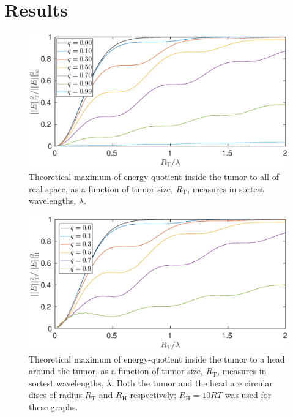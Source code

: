 \documentclass[11pt,a4paper, 
swedish,english %
]{article}
\newcommand{\RT}{\ensuremath{R_{\text{T}}}}
\newcommand{\RH}{\ensuremath{R_{\text{H}}}}
\begin{document}
\section{Results}

\begin{figure}\centering
\centerline{ %
\includegraphics[width=18cm]{ring_T-infty_L1000.eps}
}
\caption{Theoretical maximum of energy-quotient inside the tumor
  to all of real space, as a function of tumor size, $\RT$, measures
  in sortest wavelengths, $\lambda$.}
\label{fig:T-infty}
\end{figure}

\begin{figure}\centering
\centerline{ %
\includegraphics[width=18cm]{ring_T-H_L1000.eps}
}
\caption{Theoretical maximum of energy-quotient inside the tumor
  to a head around the tumor, as a function of tumor size, $\RT$,
  measures in sortest wavelengths, $\lambda$. Both the tumor and the
  head are circular discs of radius $\RT$ and $\RH$ respectively;
  $\RH=10RT$ was used for these graphs.}
\label{fig:T-infty}
\end{figure}
\end{document}
